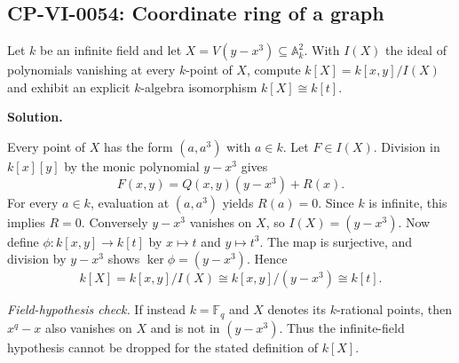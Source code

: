 
\subsection*{CP-VI-0054: Coordinate ring of a graph}

Let $k$ be an infinite field and let $X=V(y-x^3)\subseteq\mathbb A_k^2$.
With $I(X)$ the ideal of polynomials vanishing at every $k$-point of $X$,
compute $k[X]=k[x,y]/I(X)$ and exhibit an explicit $k$-algebra
isomorphism $k[X]\cong k[t]$.

\medskip
\noindent\textbf{Solution.}

Every point of $X$ has the form $(a,a^3)$ with $a\in k$.
Let $F\in I(X)$. Division in $k[x][y]$ by the monic polynomial
$y-x^3$ gives
\[
F(x,y)=Q(x,y)(y-x^3)+R(x).
\]
For every $a\in k$, evaluation at $(a,a^3)$ yields $R(a)=0$.
Since $k$ is infinite, this implies $R=0$. Conversely $y-x^3$
vanishes on $X$, so $I(X)=(y-x^3)$.
Now define $\phi:k[x,y]\to k[t]$ by $x\mapsto t$ and $y\mapsto t^3$.
The map is surjective, and division by $y-x^3$ shows
$\ker\phi=(y-x^3)$. Hence
\[
k[X]=k[x,y]/I(X)\cong k[x,y]/(y-x^3)\cong k[t].
\]

\noindent\emph{Field-hypothesis check.} If instead $k=\mathbb F_q$ and
$X$ denotes its $k$-rational points, then $x^q-x$ also vanishes on
$X$ and is not in $(y-x^3)$. Thus the infinite-field hypothesis
cannot be dropped for the stated definition of $k[X]$.
